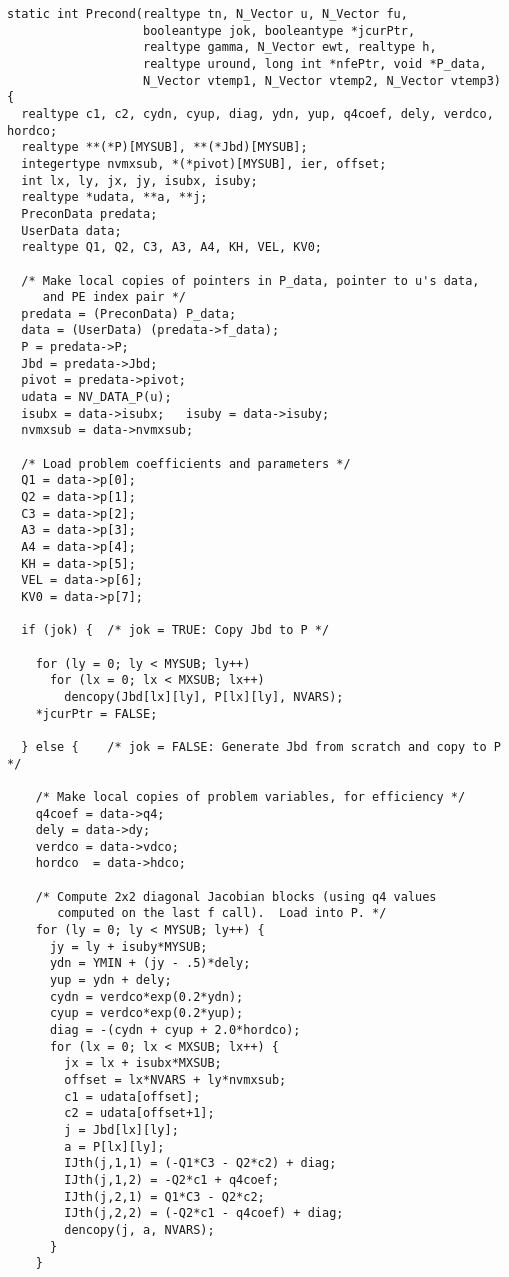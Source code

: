 \begin{verbatim}
static int Precond(realtype tn, N_Vector u, N_Vector fu, 
                   booleantype jok, booleantype *jcurPtr, 
                   realtype gamma, N_Vector ewt, realtype h,
                   realtype uround, long int *nfePtr, void *P_data,
                   N_Vector vtemp1, N_Vector vtemp2, N_Vector vtemp3)
{
  realtype c1, c2, cydn, cyup, diag, ydn, yup, q4coef, dely, verdco, hordco;
  realtype **(*P)[MYSUB], **(*Jbd)[MYSUB];
  integertype nvmxsub, *(*pivot)[MYSUB], ier, offset;
  int lx, ly, jx, jy, isubx, isuby;
  realtype *udata, **a, **j;
  PreconData predata;
  UserData data;
  realtype Q1, Q2, C3, A3, A4, KH, VEL, KV0;

  /* Make local copies of pointers in P_data, pointer to u's data,
     and PE index pair */
  predata = (PreconData) P_data;
  data = (UserData) (predata->f_data);
  P = predata->P;
  Jbd = predata->Jbd;
  pivot = predata->pivot;
  udata = NV_DATA_P(u);
  isubx = data->isubx;   isuby = data->isuby;
  nvmxsub = data->nvmxsub;

  /* Load problem coefficients and parameters */
  Q1 = data->p[0];
  Q2 = data->p[1];
  C3 = data->p[2];
  A3 = data->p[3];
  A4 = data->p[4];
  KH = data->p[5];
  VEL = data->p[6];
  KV0 = data->p[7];

  if (jok) {  /* jok = TRUE: Copy Jbd to P */

    for (ly = 0; ly < MYSUB; ly++)
      for (lx = 0; lx < MXSUB; lx++)
        dencopy(Jbd[lx][ly], P[lx][ly], NVARS);
    *jcurPtr = FALSE;

  } else {    /* jok = FALSE: Generate Jbd from scratch and copy to P */

    /* Make local copies of problem variables, for efficiency */
    q4coef = data->q4;
    dely = data->dy;
    verdco = data->vdco;
    hordco  = data->hdco;
    
    /* Compute 2x2 diagonal Jacobian blocks (using q4 values 
       computed on the last f call).  Load into P. */
    for (ly = 0; ly < MYSUB; ly++) {
      jy = ly + isuby*MYSUB;
      ydn = YMIN + (jy - .5)*dely;
      yup = ydn + dely;
      cydn = verdco*exp(0.2*ydn);
      cyup = verdco*exp(0.2*yup);
      diag = -(cydn + cyup + 2.0*hordco);
      for (lx = 0; lx < MXSUB; lx++) {
        jx = lx + isubx*MXSUB;
        offset = lx*NVARS + ly*nvmxsub;
        c1 = udata[offset];
        c2 = udata[offset+1];
        j = Jbd[lx][ly];
        a = P[lx][ly];
        IJth(j,1,1) = (-Q1*C3 - Q2*c2) + diag;
        IJth(j,1,2) = -Q2*c1 + q4coef;
        IJth(j,2,1) = Q1*C3 - Q2*c2;
        IJth(j,2,2) = (-Q2*c1 - q4coef) + diag;
        dencopy(j, a, NVARS);
      }
    }
    

\end{verbatim}
